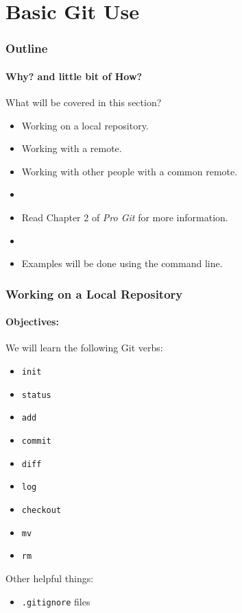 \section{Basic Git Use}
\begin{frame}[t]
  \frametitle{Outline}
  \framesubtitle{Why? and little bit of How?}
\end{frame}

\begin{frame}[t]{What will be covered in this section?}
  \begin{itemize}
    \item Working on a local repository.
    \item Working with a remote.
    \item Working with other people with a common remote.
    \item[]
    \item Read Chapter 2 of {\it Pro Git} for more information.
    \item[]
    \item Examples will be done using the command line.
  \end{itemize}
\end{frame}


\begin{frame}[t]
  \frametitle{Working on a Local Repository}
  \framesubtitle{Objectives:}
    We will learn the following Git verbs:
  \begin{itemize}
    \item {\tt init}
    \item {\tt status}
    \item {\tt add}
    \item {\tt commit}
    \item {\tt diff}
    \item {\tt log}
    \item {\tt checkout} 
    \item {\tt mv} 
    \item {\tt rm}
  \end{itemize}
  
  Other helpful things:
  \begin{itemize}
    \item {\tt .gitignore} files
  \end{itemize}
\end{frame}


